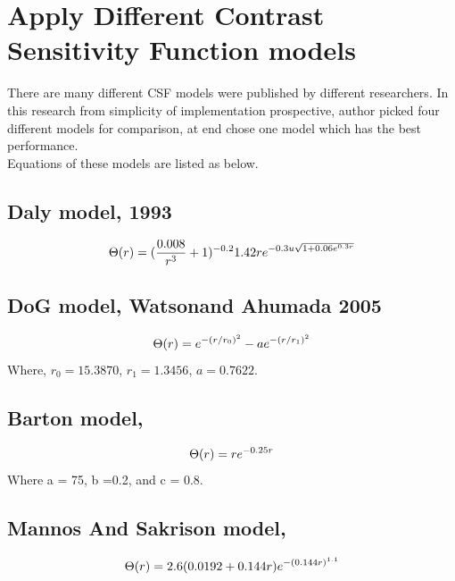 \documentclass{article}
\begin{document}
\section{Apply Different Contrast Sensitivity Function models}
There are many different CSF models were published by different researchers. In this research from simplicity of implementation prospective, author picked four different models for comparison, at end chose one model which has the best performance.\\
Equations of these models are listed as below.
\subsection{Daly model, 1993\cite{UseCSFinFusedIMage}}
\begin{equation}
    \centering
    \label{eq:daly}
     \Theta(r) = (\frac{0.008}{r^3}+1)^{-0.2}1.42re^{-0.3u\sqrt{1+0.06e^{0.3r}}}
\end{equation}
\subsection{DoG model, Watsonand Ahumada 2005\cite{Standard-Model-Contrast}}
\begin{equation}
    \centering
    \label{eq:DoG}
     \Theta(r) = e^{-(r/r_0)^2}-ae^{-(r/r_1)^2}
\end{equation}
Where, $r_0 = 15.3870$, $r_1 = 1.3456$, $a = 0.7622$.
\subsection{Barton model, \cite{AssessmentAlgoImageFusion}}
\begin{equation}
    \centering
    \label{eq:mannos}
     \Theta(r) = re^{-0.25r}
\end{equation}
Where a = 75, b =0.2, and c = 0.8.
\subsection{Mannos And Sakrison model,\cite{Mannos-Sakrison}}
\begin{equation}
    \centering
    \label{eq:mannos}
     \Theta(r) = 2.6(0.0192+0.144r)e^{-(0.144r)^{1.1}}
\end{equation}
\end{document}
